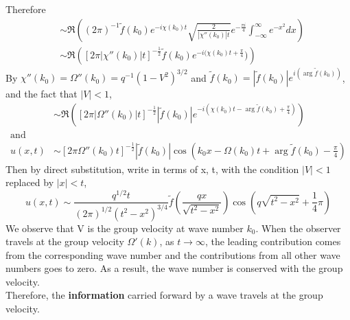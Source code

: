 \documentclass[a4paper,11pt]{article}
\begin{document}
Therefore 
\begin{align*}
& \sim \Re\left((2\pi)^{-1}\tilde{f}(k_0)e^{-i\chi(k_0)t}\sqrt{\frac{2}{|\chi''(k_0)|t}}e^{-\frac{\pi i}{4}} \int_{-\infty}^{\infty} e^{-x^2}dx\right)
\\
& \sim \Re\left([2\pi|\chi''(k_0)|t]^{-\frac{1}{2}}\tilde{f}(k_0) e^{-i(\chi(k_0)t+\frac{\pi}{4}})\right)
\end{align*}
By $\chi''(k_0) = \Omega''(k_0) = q^{-1}(1-V^2)^{3/2}$ and $\tilde{f}(k_0) = |\tilde{f}(k_0)|e^{i(\arg\tilde{f}(k_0))}$, and the fact that $|V| < 1$,
\begin{align*}
&\sim \Re\left([2\pi|\Omega''(k_0)|t]^{-\frac{1}{2}}|\tilde{f}(k_0)| e^{-i(\chi(k_0)t-\arg\tilde{f}(k_0)+\frac{\pi}{4})}\right)\\
\text{and}\\
 u(x,t)& \sim [2\pi \Omega''(k_0) t]^{-\frac{1}{2}}|\tilde{f}(k_0)| \cos(k_0 x - \Omega(k_0)t+\arg\tilde{f}(k_0)-\frac{\pi}{4})
\end{align*}
Then by direct substitution, write in terms of x, t, with the condition $|V| < 1$ replaced by  $|x|<t$,
\begin{equation}
u(x,t) \sim \frac{q^{1/2}t}{(2\pi)^{1/2}(t^2-x^2)^{3/4}}\tilde{f}\left(\frac{qx}{\sqrt{t^2-x^2}}\right)\cos\left(q\sqrt{t^2-x^2}+\frac{1}{4}\pi\right)
\label{4}
\end{equation}
We observe that V is the group velocity at wave number $k_0$. When the observer travels at the group velocity $\Omega'(k)$, as $t\to \infty$, the leading contribution comes from the corresponding wave number and the contributions from all other wave numbers goes to zero. As a result, the wave number is conserved with the group velocity. \\ Therefore, the \textbf{information} carried forward by a wave travels at the group velocity. 
\end{document}
